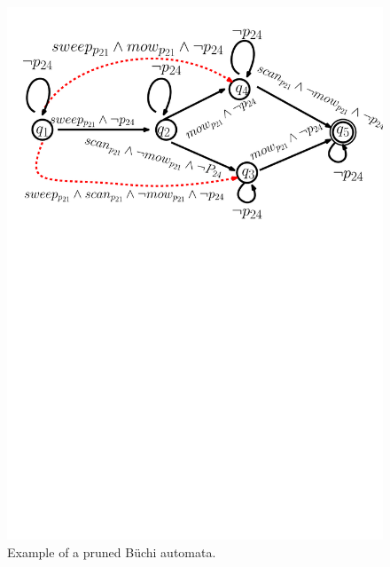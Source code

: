 \documentclass[10pt]{article}
\begin{document}
\begin{figure}[ht]
	\centering
	\includegraphics[scale=0.35]{figs/example_decomposable.pdf}
	\caption{Example of a pruned B\"{u}chi automata.}
	\label{fig:example_decomposable}
\end{figure}
\end{document}
